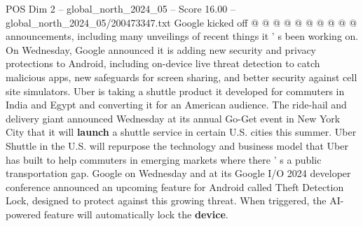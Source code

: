 \begin{textsample}{POS Dim 2 – global\_north\_2024\_05 – Score 16.00 – global\_north\_2024\_05/200473347.txt}
Google kicked off @ @ @ @ @ @ @ @ @ @ announcements, including many unveilings of recent things it ' s been working on.
On Wednesday, Google announced it is adding new security and privacy protections to Android, including on-device live threat detection to catch malicious apps, new safeguards for screen sharing, and better security against cell site simulators.
Uber is taking a shuttle product it developed for commuters in India and Egypt and converting it for an American audience.
The ride-hail and delivery giant announced Wednesday at its annual Go-Get event in New York City that it will \textbf{launch} a shuttle service in certain U.S. cities this summer.
Uber Shuttle in the U.S. will repurpose the technology and business model that Uber has built to help commuters in emerging markets where there ' s a public transportation gap.
Google on Wednesday and at its Google I/O 2024 developer conference announced an upcoming feature for Android called Theft Detection Lock, designed to protect against this growing threat.
When triggered, the AI-powered feature will automatically lock the \textbf{device}.

\end{textsample}
